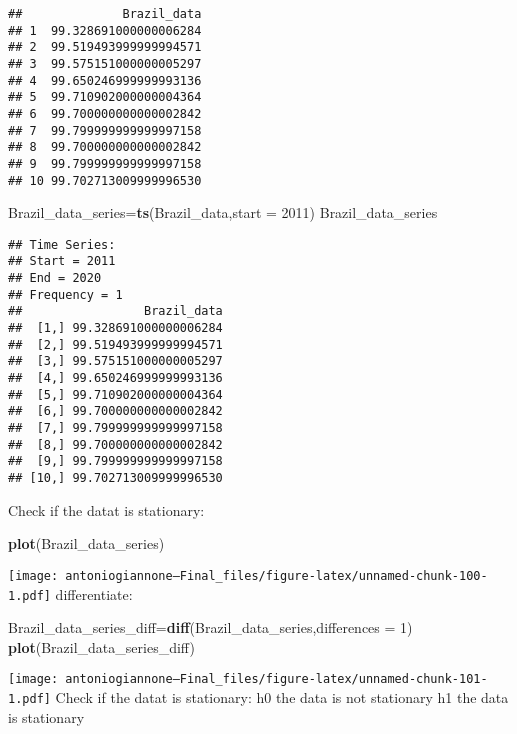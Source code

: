 \documentclass[
]{article}
\newenvironment{Shaded}{\begin{snugshade}}{\end{snugshade}}
\newcommand{\AttributeTok}[1]{\textcolor[rgb]{0.13,0.29,0.53}{#1}}
\newcommand{\DecValTok}[1]{\textcolor[rgb]{0.00,0.00,0.81}{#1}}
\newcommand{\FunctionTok}[1]{\textcolor[rgb]{0.13,0.29,0.53}{\textbf{#1}}}
\newcommand{\NormalTok}[1]{#1}
\newcommand{\OtherTok}[1]{\textcolor[rgb]{0.56,0.35,0.01}{#1}}
\begin{document}
\begin{verbatim}
##              Brazil_data
## 1  99.328691000000006284
## 2  99.519493999999994571
## 3  99.575151000000005297
## 4  99.650246999999993136
## 5  99.710902000000004364
## 6  99.700000000000002842
## 7  99.799999999999997158
## 8  99.700000000000002842
## 9  99.799999999999997158
## 10 99.702713009999996530
\end{verbatim}

\begin{Shaded}
\begin{Highlighting}[]
\NormalTok{Brazil\_data\_series}\OtherTok{=}\FunctionTok{ts}\NormalTok{(Brazil\_data,}\AttributeTok{start =} \DecValTok{2011}\NormalTok{)}
\NormalTok{Brazil\_data\_series}
\end{Highlighting}
\end{Shaded}

\begin{verbatim}
## Time Series:
## Start = 2011 
## End = 2020 
## Frequency = 1 
##                 Brazil_data
##  [1,] 99.328691000000006284
##  [2,] 99.519493999999994571
##  [3,] 99.575151000000005297
##  [4,] 99.650246999999993136
##  [5,] 99.710902000000004364
##  [6,] 99.700000000000002842
##  [7,] 99.799999999999997158
##  [8,] 99.700000000000002842
##  [9,] 99.799999999999997158
## [10,] 99.702713009999996530
\end{verbatim}

Check if the datat is stationary:

\begin{Shaded}
\begin{Highlighting}[]
\FunctionTok{plot}\NormalTok{(Brazil\_data\_series)}
\end{Highlighting}
\end{Shaded}

\texttt{[image: antoniogiannone---Final\_files/figure-latex/unnamed-chunk-100-1.pdf]}
differentiate:

\begin{Shaded}
\begin{Highlighting}[]
\NormalTok{Brazil\_data\_series\_diff}\OtherTok{=}\FunctionTok{diff}\NormalTok{(Brazil\_data\_series,}\AttributeTok{differences =} \DecValTok{1}\NormalTok{)}
\FunctionTok{plot}\NormalTok{(Brazil\_data\_series\_diff)}
\end{Highlighting}
\end{Shaded}

\texttt{[image: antoniogiannone---Final\_files/figure-latex/unnamed-chunk-101-1.pdf]}
Check if the datat is stationary: h0 the data is not stationary h1 the
data is stationary
\end{document}
